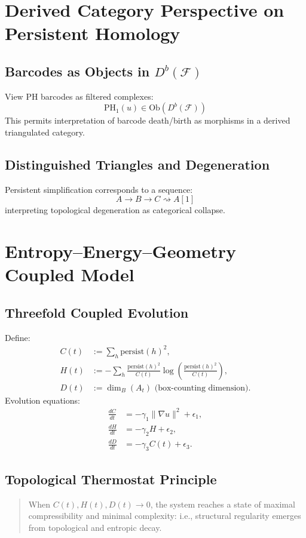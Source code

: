 \documentclass[11pt]{article}
\theoremstyle{remark}
\begin{document}
\section{Derived Category Perspective on Persistent Homology}

\subsection{Barcodes as Objects in $D^b(\mathcal{F})$}
View PH barcodes as filtered complexes:
\[
\mathrm{PH}_1(u) \in \text{Ob}(D^b(\mathcal{F}))
\]
This permits interpretation of barcode death/birth as morphisms in a derived triangulated category.

\subsection{Distinguished Triangles and Degeneration}
Persistent simplification corresponds to a sequence:
\[
A \to B \to C \rightsquigarrow A[1]
\]
interpreting topological degeneration as categorical collapse.

\section{Entropy–Energy–Geometry Coupled Model}

\subsection{Threefold Coupled Evolution}
Define:
\begin{align*}
    C(t) &:= \sum_h \text{persist}(h)^2, \\
    H(t) &:= -\sum_h \frac{\text{persist}(h)^2}{C(t)} \log \left( \frac{\text{persist}(h)^2}{C(t)} \right), \\
    D(t) &:= \dim_B(A_t) \text{ (box-counting dimension)}.
\end{align*}
Evolution equations:
\begin{align*}
    \frac{dC}{dt} &= -\gamma_1 \|\nabla u\|^2 + \epsilon_1, \\
    \frac{dH}{dt} &= -\gamma_2 H + \epsilon_2, \\
    \frac{dD}{dt} &= -\gamma_3 C(t) + \epsilon_3.
\end{align*}

\subsection{Topological Thermostat Principle}
\begin{quote}
When $C(t), H(t), D(t) \to 0$, the system reaches a state of maximal compressibility and minimal complexity: i.e., structural regularity emerges from topological and entropic decay.
\end{quote}
\end{document}

